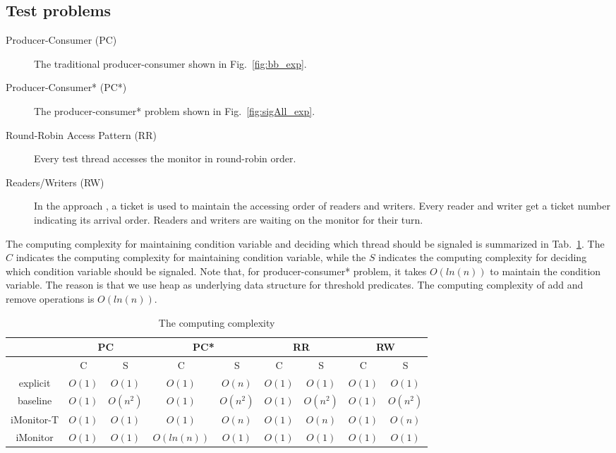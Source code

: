 \documentclass[preprint]{sigplanconf}
\begin{document}
\subsection{Test problems}
\begin{description}
    \item[Producer-Consumer (PC)] The traditional producer-consumer shown in 
        Fig.~\ref{fig:bb_exp}.
    \item[Producer-Consumer* (PC*)] The producer-consumer* problem shown in
        Fig.~\ref{fig:sigAll_exp}. 
    \item[Round-Robin Access Pattern (RR)] Every test thread accesses the
        monitor in round-robin order. 
    \item[Readers/Writers (RW)] In the approach \cite{bh05}, a ticket is used
        to maintain the accessing order of readers and writers. Every reader
        and writer get a ticket number indicating its arrival order. Readers
        and writers are waiting on the monitor for their turn. 
\end{description}

The computing complexity for maintaining condition variable and deciding which 
thread should be signaled is summarized in Tab.~\ref{tab:complexity}. The $C$
indicates the computing complexity for maintaining condition variable, while 
the $S$ indicates the computing complexity for deciding which condition 
variable should be signaled. Note that, for producer-consumer* problem, it
takes $O(ln(n))$ to maintain the condition variable. The reason is that we use
heap as underlying data structure for threshold predicates. The computing
complexity of add and remove operations is $O(ln(n))$.

\begin{table}[ht!]
   \centering
   \begin{tabular}{|c||c|c||c|c||c|c||c|c|}
      \hline 
      & \multicolumn{2}{c||}{PC} & \multicolumn{2}{c||}{PC*} & 
        \multicolumn{2}{c||}{RR} & \multicolumn{2}{c|}{RW} \\
      \hline
         & C & S & C & S & C & S & C & S \\
      \hline 
      \hline 
      explicit & $O(1)$ & $O(1)$ & $O(1)$ & $O(n)$ & $O(1)$ & $O(1)$ & $O(1)$ &
      $O(1)$ \\
      \hline 
      baseline & $O(1)$ & $O(n^2)$ & $O(1)$ & $O(n^2)$ & $O(1)$ & $O(n^2)$ &
      $O(1)$ & $O(n^2)$ \\
      \hline 
      iMonitor-T & $O(1)$ & $O(1)$ & $O(1)$ & $O(n)$ & $O(1)$ & $O(n)$ & $O(1)$ 
      & $O(n)$ \\
      \hline 
      iMonitor & $O(1)$ & $O(1)$ & $O(ln(n))$ & $O(1)$ & $O(1)$ & $O(1)$ & 
      $O(1)$ & $O(1)$\\
      \hline 
   \end{tabular}
   \caption{The computing complexity}
   \label{tab:complexity}
\end{table}
\end{document}
